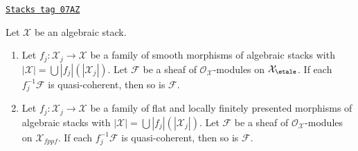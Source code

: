 \begin{lemma}
\label{stacks-cohomology-lemma-check-qc-on-etale-covering}
\href{https://stacks.math.columbia.edu/tag/07AZ}{\texttt{Stacks tag 07AZ}}

Let $\mathcal{X}$ be an algebraic stack.
\begin{enumerate}
\item Let $f_j : \mathcal{X}_j \to \mathcal{X}$ be a family of smooth
morphisms of algebraic stacks with
$|\mathcal{X}| =\bigcup |f_j|(|\mathcal{X}_j|)$.
Let $\mathcal{F}$ be a sheaf of $\mathcal{O}_\mathcal{X}$-modules
on $\mathcal{X}_\etale$. If each $f_j^{-1}\mathcal{F}$
is quasi-coherent, then so is $\mathcal{F}$.
\item Let $f_j : \mathcal{X}_j \to \mathcal{X}$ be a family of flat and
locally finitely presented morphisms of algebraic stacks with
$|\mathcal{X}| =\bigcup |f_j|(|\mathcal{X}_j|)$.
Let $\mathcal{F}$ be a sheaf of $\mathcal{O}_\mathcal{X}$-modules
on $\mathcal{X}_{fppf}$. If each $f_j^{-1}\mathcal{F}$
is quasi-coherent, then so is $\mathcal{F}$.
\end{enumerate}
\end{lemma}

